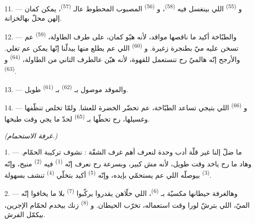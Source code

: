 \VUsaut{4.0mm}
\VUsaut{3.0mm}

11. --- و \textsuperscript{(55)} اللي بينغسل فيه
 \textsuperscript{(58)}، و
\textsuperscript{(56)} المصبوب المحطوط عالـ
\textsuperscript{(57)}، يمكن كمان إلهن محلّ بهالخزانة.

12. --- والطبّاخة أكيد ما ناقصها مواقد، لأنه هيّو كمان، على طرف
الطاولة،  \textsuperscript{(59)} عم تسخن عليه ميّ
بطنجرة زغيرة. و \textsuperscript{(60)} اللي عم يطلع منها
بيدلّنا إنّها يمكن عم تغلي. والأرجح إنّه هالميّ رح تنستعمل للقهوة،
لأنه هيّن عالطرف التاني من الطاولة، 
\textsuperscript{(64)} و \textsuperscript{(63)}.

13. --- والموقد موصول بـ \textsuperscript{(62)}
بـ \textsuperscript{(61)} طويل.

14. --- و \textsuperscript{(66)} اللي بتيجي
تساعد الطبّاخة، عم تحضّر الخضرة للعشا. ولمّا تخلص تنظّفها وغسيلها، رح
تحطّها بـ \textsuperscript{(65)} لحدّ ما يجي وقت طبخها.

\VUsaut{4.0mm}
{\centering\fontsize{10.2pt}{10.2pt}\selectfont{} \textit{(غرفة الاستحمام.)}\par}
\VUsaut{3.0mm}

1. --- ما ضلّ إلنا غير قلّة أدب وحدة لنعرف أهم غرف الشقّة : نشوف
تركيبة الحمّام. وهاد ما رح ياخد وقت طويل، لأنه مش كبير، وبسرعة رح
نعرف إنّه  \textsuperscript{(1)} فيه 
\textsuperscript{(2)} منيح، وإنّه  \textsuperscript{(3)}
بيوصلّه اللي عم يستحمّي بإيده، وإنّه 
\textsuperscript{(5)} أكيد بتخلّي 
\textsuperscript{(4)} تنشف بسهولة.

2. --- وهالغرفة حيطانها مكسيّة بـ \textsuperscript{(6)}،
اللي خلّاهن يقدروا يركّبوا  \textsuperscript{(7)} بلا ما
يخافوا إنّه الميّ، اللي بترشّ لورا وقت استعماله، تخرّب الحيطان.
و \textsuperscript{(8)} زنك بيخدم لحمّام الإجرين، بيكمّل
الفرش.

\VUsaut{6.0mm}
\VUfilet{22mm}
